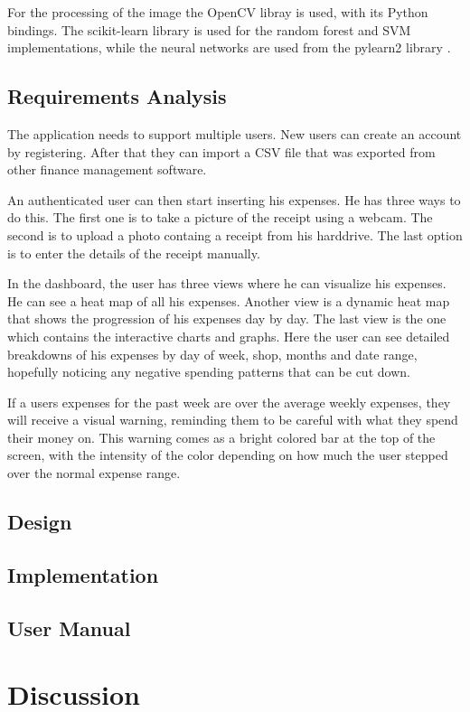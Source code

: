 For the processing of the image the OpenCV libray is used, with its Python bindings. The scikit-learn library \cite{pedregosa2011scikit} is used for the random forest and SVM implementations, while the neural networks are used from the pylearn2 library \cite{goodfellow2013pylearn2}. 
\subsection{Requirements Analysis}
The application needs to support multiple users. New users can create an account by registering. After that they can import a CSV file that was exported from other finance management software. 

An authenticated user can then start inserting his expenses. He has three ways to do this. The first one is to take a picture of the receipt using a webcam. The second is to upload a photo containg a receipt from his harddrive. The last option is to enter the details of the receipt manually. 

In the dashboard, the user has three views where he can visualize his expenses. He can see a heat map of all his expenses. Another view is a dynamic heat map that shows the progression of his expenses day by day. The last view is the one which contains the interactive charts and graphs. Here the user can see detailed breakdowns of his expenses by day of week, shop, months and date range, hopefully noticing any negative spending patterns that can be cut down. 

If a users expenses for the past week are over the average weekly expenses, they will receive a visual warning, reminding them to be careful with what they spend their money on. This warning comes as a bright colored bar at the top of the screen, with the intensity of the color depending on how much the user stepped over the normal expense range. 
\subsection{Design}
\subsection{Implementation}
\subsection{User Manual}
\label{sec:manual}
\section{Discussion}